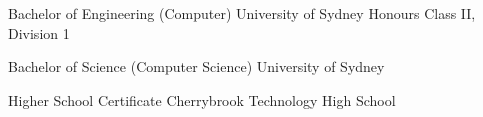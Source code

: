 \begin{education}

{Bachelor of Engineering (Computer)}
{University of Sydney}
{Honours Class II, Division 1}

{Bachelor of Science (Computer Science)}
{University of Sydney}
{}

{Higher School Certificate}
{Cherrybrook Technology High School}
{
}
\end{education}
